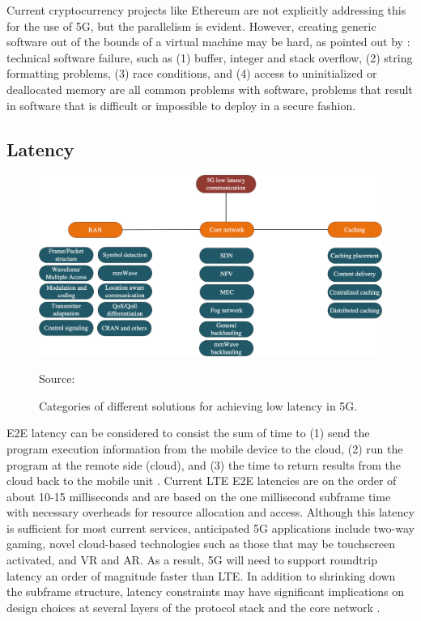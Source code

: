 \documentclass[12pt]{article}
\newcommand{\source}[1]{\caption*{Source: {#1}} }
\begin{document}
Current cryptocurrency projects like Ethereum are not explicitly addressing this for the use of \gls{5G}, but the parallelism is evident. However, creating generic software out of the bounds of a virtual machine may be hard, as pointed out by \cite{whitman2011principles}: technical software failure, such as (1) buffer, integer and stack overflow, (2) string formatting problems, (3) race conditions, and (4) access to uninitialized or deallocated memory are all common problems with software, problems that result in software that is difficult or impossible to deploy in a secure fashion.

\subsection{Latency}

\begin{figure}
  \centering
    \includegraphics[width=\textwidth]{assets/latency.png}
  \caption{Categories of different solutions for achieving low latency in 5G.}
  \source{\cite{parvez2018survey}}
  \label{fig:latencycat}
\end{figure}

\gls{E2E} latency can be considered to consist the sum of time to (1) send the program execution information from the mobile device to the cloud, (2) run the program at the remote side (cloud), and (3) the time to return results from the cloud back to the mobile unit \cite{barbarossa2014communicating}. Current \gls{LTE} \gls{E2E} latencies are on the order of about 10-15 milliseconds and are based on the one millisecond subframe time with necessary overheads for resource allocation and access. Although this latency is sufficient for most current services, anticipated \gls{5G} applications include two-way gaming, novel cloud-based technologies such as those that may be touchscreen activated, and \gls{VR} and \gls{AR}. As a result, \gls{5G} will need to support roundtrip latency an order of magnitude faster than \gls{LTE}. In addition to shrinking down the subframe structure, latency constraints may have significant implications on design choices at several layers of the protocol stack and the core network \cite{andrews2014will}.
\end{document}
